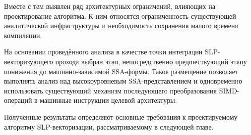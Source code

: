 Вместе с тем выявлен ряд архитектурных ограничений, влияющих на проектирование алгоритма.
К ним относятся ограниченность существующей аналитической инфраструктуры и необходимость сохранения малого времени компиляции.

На основании проведённого анализа в качестве точки интеграции SLP-векторизующего прохода выбран этап, непосредственно предшествующий этапу понижения 
до машинно-зависимой SSA-формы. Такое размещение позволяет выполнять анализ над высокоуровневым SSA-представлением и одновременно использовать существующий
механизм последующего преобразования SIMD-операций в машинные инструкции целевой архитектуры.

Полученные результаты определяют основные требования к проектируемому алгоритму SLP-векторизации, рассматриваемому в следующей главе.